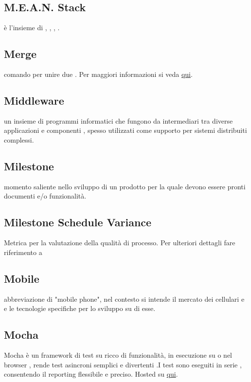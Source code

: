 \documentclass[12pt,a4paper]{article}
\begin{document}
\subsection{M.E.A.N. Stack}
è l'insieme di , , , .

\subsection{Merge} 
 comando  per unire due . Per maggiori informazioni si veda \href{https://git-scm.com/docs/}{qui}.

\subsection{Middleware} 
 un insieme di programmi informatici che fungono da intermediari tra diverse applicazioni e componenti ,  spesso utilizzati come supporto per sistemi distribuiti complessi.


\subsection{Milestone} 
 momento saliente nello sviluppo di un prodotto  per la quale devono essere pronti documenti e/o funzionalità.

\subsection{Milestone Schedule Variance}
 Metrica per la valutazione della qualità di processo. Per ulteriori dettagli fare riferimento a \PdQ{}

\subsection{Mobile} 
 abbreviazione di "mobile phone", nel contesto si intende il mercato dei cellulari e  e le tecnologie specifiche per lo sviluppo su di esse.

\subsection{Mocha} 
 Mocha è un framework di test su  ricco di funzionalità, in esecuzione su  o nel browser , rende test asincroni semplici  e divertenti .I test sono eseguiti in serie , consentendo il reporting flessibile e preciso. Hosted su 
\href{https://github.com/mochajs/mocha}{qui}.
\end{document}
